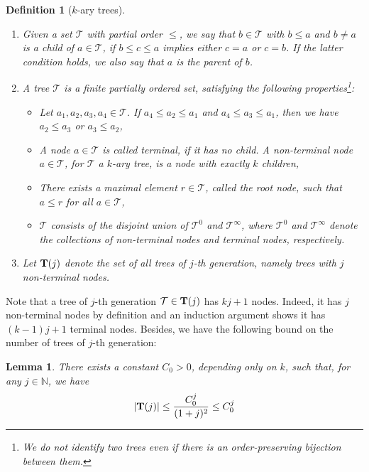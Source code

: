 \documentclass[letterpaper, 11pt,  reqno]{amsart}
\newtheorem{lemma}[theorem]{Lemma}
\newtheorem{definition}[theorem]{Definition}
\newcommand{\1}{\hspace{0.5mm}\text{I}\hspace{0.5mm}}
\newcommand{\TT}{\mathcal{T}}
\newcommand{\BT}{{\bf T}}%
\newcommand{\NB}{\mathbb{N}}
\numberwithin{equation}{section}
\numberwithin{theorem}{section}
\newcommand{\abs}[1]{\lvert#1\rvert}
\begin{document}
\begin{definition}[$k$-ary trees]
\label{DEF:Trees}
\rm 
\begin{enumerate}
	\item Given a set $\TT$ with partial order $\leq$, we say that $b \in \TT$ with $b \leq a$ and $b \ne a$ is a child of $a \in \TT$, if  $b\leq c \leq a$ implies either $c = a$ or $c = b$. If the latter condition holds, we also say that $a$ is the parent of $b$.

	\item A tree $\TT$ is a finite partially ordered set,  satisfying the following properties\footnote{We do not identify two trees even if there is an order-preserving bijection between them.}:
\begin{itemize}
	\item Let $a_1, a_2, a_3, a_4 \in \TT$. If $a_4 \leq a_2 \leq a_1$ and  $a_4 \leq a_3 \leq a_1$, then we have $a_2\leq a_3$ or $a_3 \leq a_2$,

	\item A node $a\in \TT$ is called terminal, if it has no child. A non-terminal node $a\in \TT$, for $\TT$ a $k$-ary tree, is a node with exactly $k$ children, 

	\item There exists a maximal element $r \in \TT$, called the root node, such that $a \leq r$ for all $a \in \TT$, 

	\item $\TT$ consists of the disjoint union of $\TT^0$ and $\TT^\infty$, where $\TT^0$ and $\TT^\infty$ denote the collections of non-terminal nodes and terminal nodes, respectively.
\end{itemize}

	\item Let $\BT(j)$ denote the set of all trees of $j$-th generation, namely trees with $j$ non-terminal nodes.
\end{enumerate}
\end{definition}

Note that a tree of $j$-th generation $\TT \in \BT(j)$ has $kj + 1$ nodes. Indeed, it has $j$ non-terminal nodes by definition and an induction argument shows it has $(k-1)j + 1$ terminal nodes. Besides, we have the following bound on the number of trees of $j$-th generation:

\begin{lemma}
\label{LEM:NumberOfTrees}
There exists a constant $C_0 > 0$, depending only on $k$, such that, for any $j \in \NB$, we have
\begin{equation}
\label{EQ:NumberOfTrees}
\abs{\BT (j)} \leq \frac{C^j_0}{(1 + j)^2 } \leq C^j_0
\end{equation}
\end{lemma}
\end{document}

